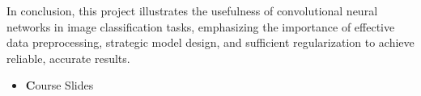 \documentclass[10pt]{article}
\begin{document}
In conclusion, this project illustrates the usefulness of convolutional neural networks in image classification tasks, emphasizing the importance of effective data preprocessing, strategic model design, and sufficient regularization to achieve reliable, accurate results.





\begin{itemize}
\item \textbf Course Slides

\end{itemize}
\end{document}

